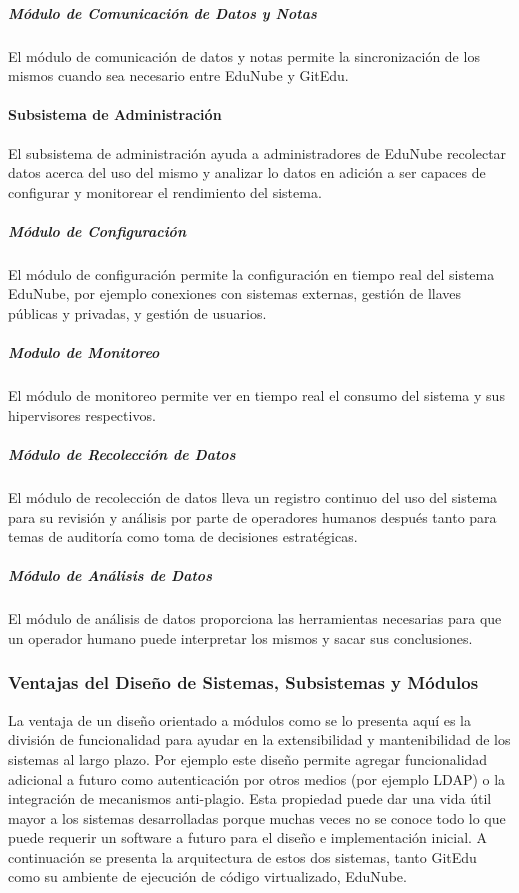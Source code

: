 \subparagraph{Módulo de Comunicación de Datos y Notas}
El módulo de comunicación de datos y notas permite la sincronización de los mismos cuando sea necesario entre EduNube y GitEdu.

\paragraph{Subsistema de Administración}
El subsistema de administración ayuda a administradores de EduNube recolectar datos acerca del uso del mismo y analizar lo datos en adición a ser capaces de configurar y monitorear el rendimiento del sistema.

\subparagraph{Módulo de Configuración}
El módulo de configuración permite la configuración en tiempo real del sistema EduNube, por ejemplo conexiones con sistemas externas, gestión de llaves públicas y privadas, y gestión de usuarios.

\subparagraph{Modulo de Monitoreo}
El módulo de monitoreo permite ver en tiempo real el consumo del sistema y sus hipervisores respectivos.

\subparagraph{Módulo de Recolección de Datos}
El módulo de recolección de datos lleva un registro continuo del uso del sistema para su revisión y análisis por parte de operadores humanos después tanto para temas de auditoría como toma de decisiones estratégicas.

\subparagraph{Módulo de Análisis de Datos}
El módulo de análisis de datos proporciona las herramientas necesarias para que un operador humano puede interpretar los mismos y sacar sus conclusiones.

\subsubsection{Ventajas del Diseño de Sistemas, Subsistemas y Módulos}
La ventaja de un diseño orientado a módulos como se lo presenta aquí es la división de funcionalidad para ayudar en la extensibilidad y mantenibilidad de los sistemas al largo plazo. Por ejemplo este diseño permite agregar funcionalidad adicional a futuro como autenticación por otros medios (por ejemplo LDAP) o la integración de mecanismos anti-plagio. Esta propiedad puede dar una vida útil mayor a los sistemas desarrolladas porque muchas veces no se conoce todo lo que puede requerir un software a futuro para el diseño e implementación inicial. A continuación se presenta la arquitectura de estos dos sistemas, tanto GitEdu como su ambiente de ejecución de código virtualizado, EduNube.


